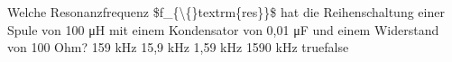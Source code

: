     {Welche Resonanzfrequenz \$f\_\{\textbackslash\{\}textrm\{res\}\}\$ hat die Reihenschaltung einer Spule von 100 μH mit einem Kondensator von 0,01 μF und einem Widerstand von 100 Ohm?}
    {159 kHz}
    {15,9 kHz}
    {1,59 kHz}
    {1590 kHz}
    {true}{false}